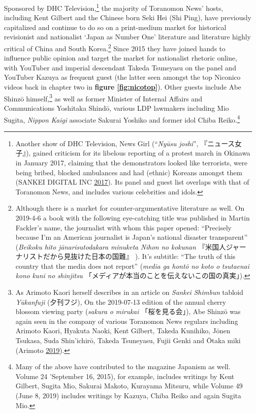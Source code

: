 \documentclass[10pt,british,A4paper,,openany]{memoir}
\begin{document}
Sponsored by DHC Television,\footnote{Another show of DHC Television,
  News Girl (``\emph{Nyūsu joshi}'', 『ニュース女子』), gained criticism
  for its libelous reporting of a protest march in Okinawa in January
  2017, claiming that the demonstrators looked like terrorists, were
  being bribed, blocked ambulances and had (ethnic) Koreans amongst them
  (SANKEI DIGITAL INC
  \protect\hyperlink{ref-sankei_digital_inc_eng._2017}{2017}). Its panel
  and guest list overlaps with that of Toranomon News, and includes
  various celebrities and idols.} the majority of Toranomon News' hosts,
including Kent Gilbert and the Chinese born Seki Hei (Shi Ping), have
previously capitalized and continue to do so on a print-medium market
for historical revisionist and nationalist `Japan as Number One'
literature and literature highly critical of China and South
Korea.\footnote{Although there is a market for counter-argumentative
  literature as well. On 2019-4-6 a book with the following eye-catching
  title was published in Martin Fackler's name, the journalist with whom
  this paper opened: ``Precisely because I'm an American journalist is
  Japan's national disaster transparent'' (\emph{Beikoku hito
  jānarisutodakara minuketa Nihon no kokunan}
  『米国人ジャーナリストだから見抜けた日本の国難』 ). It's subtitle:
  ``The truth of this country that the media does not report''
  (\emph{media ga hontō no koto o tsutaenai kono kuni no shinjitsu}
  「メディアが本当のことを伝えないこの国の真実」).} Since 2015 they have
joined hands to influence public opinion and target the market for
nationalist rhetoric online, with YouTuber and imperial descendant
Takeda Tsuneyasu on the panel and YouTuber Kazuya as frequent guest (the
latter seen amongst the top Niconico videos back in chapter two in
\textbf{figure \ref{fig:nicotop}}). Other guests include Abe Shinzō
himself,\footnote{As Arimoto Kaori herself describes in an article on
  \emph{Sankei Shimbun} tabloid \emph{Yūkanfuji} (夕刊フジ), On the
  2019-07-13 edition of the annual cherry blossom viewing party
  (\emph{sakura o mirukai} 「桜を見る会」), Abe Shinzō was again seen in
  the company of various Toranomon News regulars including Arimoto
  Kaori, Hyakuta Naoki, Kent Gilbert, Takeda Kunihiko, Jōnen Tsukasa,
  Suda Shin'ichirō, Takeda Tsuneyasu, Fujii Genki and Ōtaka miki
  (Arimoto \protect\hyperlink{ref-arimoto_eng._2019}{2019}).} as well as
former Minister of Internal Affairs and Communications Yoshitaka Shindō,
various LDP lawmakers including Mio Sugita, \emph{Nippon Kaigi}
associate Sakurai Yoshiko and former idol Chiba Reiko.\footnote{Many of
  the above have contributed to the magazine Japanism as well. Volume 24
  'September 16, 2015), for example, includes writings by Kent Gilbert,
  Sugita Mio, Sakurai Makoto, Kurayama Mitsuru, while Volume 49 (June 8,
  2019) includes writings by Kazuya, Chiba Reiko and again Sugita Mio.}
\end{document}
